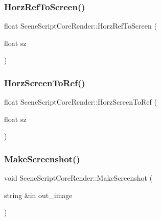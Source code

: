 \subsubsection{\texorpdfstring{Horz\+Ref\+To\+Screen()}{HorzRefToScreen()}}
{\footnotesize\ttfamily float Scene\+Script\+Core\+Render\+::\+Horz\+Ref\+To\+Screen (\begin{DoxyParamCaption}\item[{float}]{sz }\end{DoxyParamCaption})}

\hypertarget{class_scene_script_core_render_aa727741ec6ea68ce6c1e0632e1c6330f}{}\label{class_scene_script_core_render_aa727741ec6ea68ce6c1e0632e1c6330f} 
\subsubsection{\texorpdfstring{Horz\+Screen\+To\+Ref()}{HorzScreenToRef()}}
{\footnotesize\ttfamily float Scene\+Script\+Core\+Render\+::\+Horz\+Screen\+To\+Ref (\begin{DoxyParamCaption}\item[{float}]{sz }\end{DoxyParamCaption})}

\hypertarget{class_scene_script_core_render_a321acd93c9b84c0f53bfb725c9be9cfa}{}\label{class_scene_script_core_render_a321acd93c9b84c0f53bfb725c9be9cfa} 
\subsubsection{\texorpdfstring{Make\+Screenshot()}{MakeScreenshot()}}
{\footnotesize\ttfamily void Scene\+Script\+Core\+Render\+::\+Make\+Screenshot (\begin{DoxyParamCaption}\item[{string \&in}]{out\+\_\+image }\end{DoxyParamCaption})}

\hypertarget{class_scene_script_core_render_a28245df2984478f76f89ad6bfa3cddd0}{}\label{class_scene_script_core_render_a28245df2984478f76f89ad6bfa3cddd0} 

